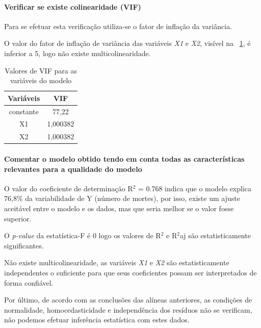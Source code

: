 \documentclass[conference]{IEEEtran}
\begin{document}
\paragraph{\textbf{Verificar se existe colinearidade (VIF)}}

Para se efetuar esta verificação utiliza-se o fator de inflação da variância.  

O valor do fator de inflação de variância das variáveis \textit{X1} e \textit{X2}, visível na \tablename~\ref{tab:vif}, é inferior a 5, logo não existe multicolinearidade.


\begin{table}[h]
	\caption{Valores de VIF para as variáveis do modelo}
	\begin{center}
		\begin{tabular}{|c|c|}
			\hline
			Variáveis & VIF \\
			\hline
			constante & 77,22 \\
			
			X1 & 1,000382 \\
	
			X2 & 1,000382 \\
			\hline
		\end{tabular} 
		\label{tab:vif}
	\end{center}
\end{table}

\medskip
\paragraph{\textbf{Comentar o modelo obtido tendo em conta todas as características relevantes para a qualidade do modelo}}

O valor do coeficiente de determinação R$^2$ = 0.768 indica que o modelo explica 76,8\% da variabilidade de Y (número de mortes), por isso, existe um ajuste aceitável entre o modelo e os dados, mas que seria melhor se o valor fosse superior.

O \textit{p-value} da estatística-F é 0 logo os valores de R$^2$ e R$^2$aj são estatisticamente significantes.


Não existe multicolinearidade, as variáveis \textit{X1} e \textit{X2} são estatisticamente independentes o suficiente para que seus coeficientes possam ser interpretados de forma confiável.

Por último, de acordo com as conclusões das alíneas anteriores, as condições de normalidade, homocedasticidade e independência dos resíduos não se verificam, não podemos efetuar inferência estatística com estes dados. 
\end{document}
